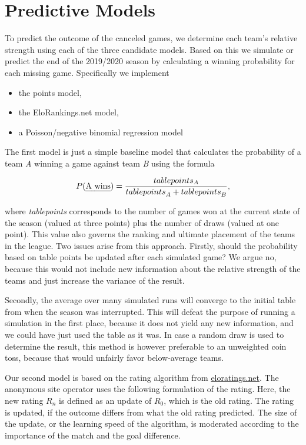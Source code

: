 \documentclass[12pt,a4paper]{article}
\begin{document}
\hypertarget{predictive-models}{%
\section{Predictive Models}\label{predictive-models}}

To predict the outcome of the canceled games, we determine each team's
relative strength using each of the three candidate models. Based on
this we simulate or predict the end of the 2019/2020 season by
calculating a winning probability for each missing game. Specifically we
implement

\begin{itemize}
\item the points model,
\item the EloRankings.net model, 
\item a Poisson/negative binomial regression model
\end{itemize}

The first model is just a simple baseline model that calculates the
probability of a team \emph{A} winning a game against team \emph{B}
using the formula

\begin{align}
P(\text{\emph{A wins}}) = \frac{table points_A}{{table points}_A + {table points}_B},
\end{align}

where \emph{tablepoints} corresponds to the number of games won at the
current state of the season (valued at three points) plus the number of
draws (valued at one point). This value also governs the ranking and
ultimate placement of the teams in the league. Two issues arise from
this approach. Firstly, should the probability based on table points be
updated after each simulated game? We argue no, because this would not
include new information about the relative strength of the teams and
just increase the variance of the result.

Secondly, the average over many simulated runs will converge to the
initial table from when the season was interrupted. This will defeat the
purpose of running a simulation in the first place, because it does not
yield any new information, and we could have just used the table as it
was. In case a random draw is used to determine the result, this method
is however preferable to an unweighted coin toss, because that would
unfairly favor below-average teams.

Our second model is based on the rating algorithm from
\href{eloratings.net/about}{eloratings.net}. The anonymous site operator
uses the following formulation of the rating. Here, the new rating
\(R_n\) is defined as an update of \(R_0\), which is the old rating. The
rating is updated, if the outcome differs from what the old rating
predicted. The size of the update, or the learning speed of the
algorithm, is moderated according to the importance of the match and the
goal difference.
\end{document}
